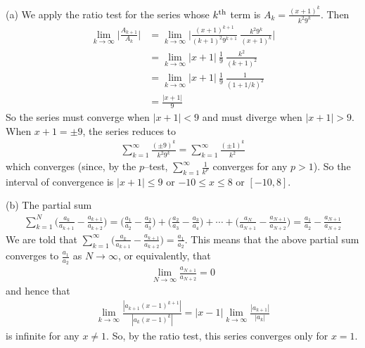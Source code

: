 \begin{solution} (a)
We apply the ratio test for the series whose $k^{\rm th}$
term is $A_k=\frac{(x+1)^k}{k^2 9^k}$. Then
\begin{align*}
\lim_{k\rightarrow\infty}\bigg|\frac{A_{k+1}}{A_k}\bigg|
&=\lim_{k\rightarrow\infty} \bigg|\frac{(x+1)^{k+1}}{(k+1)^2 9^{k+1}}
                                  \ \frac{k^2 9^k}{(x+1)^k}\bigg| \\
&=\lim_{k\rightarrow\infty} |x+1|\ \frac{1}{9}\ \frac{k^2}{(k+1)^2} \\
&=\lim_{k\rightarrow\infty} |x+1|\ \frac{1}{9}\ \frac{1}{(1+1/k)^2} \\
&=\frac{|x+1|}{9}
\end{align*}
So the series must converge when $|x+1|<9$ and must diverge when $|x+1|>9$.
When $x+1=\pm 9$, the series reduces to
\begin{align*}
\sum_{k=1}^\infty \frac{(\pm 9)^k}{k^2 9^k}
=\sum_{k=1}^\infty \frac{(\pm 1)^k}{k^2}
\end{align*}
which converges (since, by the $p$--test, $\sum_{k=1}^\infty\frac{1}{k^p}$ converges for
any $p>1$). So the interval of convergence is $|x+1|\le 9$
or $-10\le x\le 8$  or $[-10,8]$.



\noindent (b)
The partial sum
\begin{align*}
\sum_{k=1}^N\Big(\frac{a_k}{a_{k+1}}
                         -\frac{a_{k+1}}{a_{k+2}}\Big)
=\Big(\frac{a_1}{a_2}-\frac{a_2}{a_3}\Big)
 +\Big(\frac{a_2}{a_3}-\frac{a_3}{a_4}\Big)
+\cdots+ \Big(\frac{a_N}{a_{N+1}}-\frac{a_{N+1}}{a_{N+2}}\Big)
=\frac{a_1}{a_2}-\frac{a_{N+1}}{a_{N+2}}
\end{align*}
We are told that ${\displaystyle \sum_{k=1}^\infty \Big(\frac{a_k}{a_{k+1}}
                         -\frac{a_{k+1}}{a_{k+2}}\Big)
   =\frac{a_1}{a_2} }$. This means that the above partial sum converges to
$\frac{a_1}{a_2}$ as $N\rightarrow\infty$, or equivalently, that
\begin{align*}
\lim_{N\rightarrow\infty}\frac{a_{N+1}}{a_{N+2}}=0
\end{align*}
and hence that
\begin{align*}
\lim_{k\rightarrow\infty}\frac{|a_{k+1}(x-1)^{k+1}|}{|a_k(x-1)^k|}
=|x-1|\lim_{k\rightarrow\infty}\frac{|a_{k+1}|}{|a_k|}
\end{align*}
is infinite for any $x\ne 1$. So, by the ratio test, this series converges only for $x=1$.
\end{solution}


